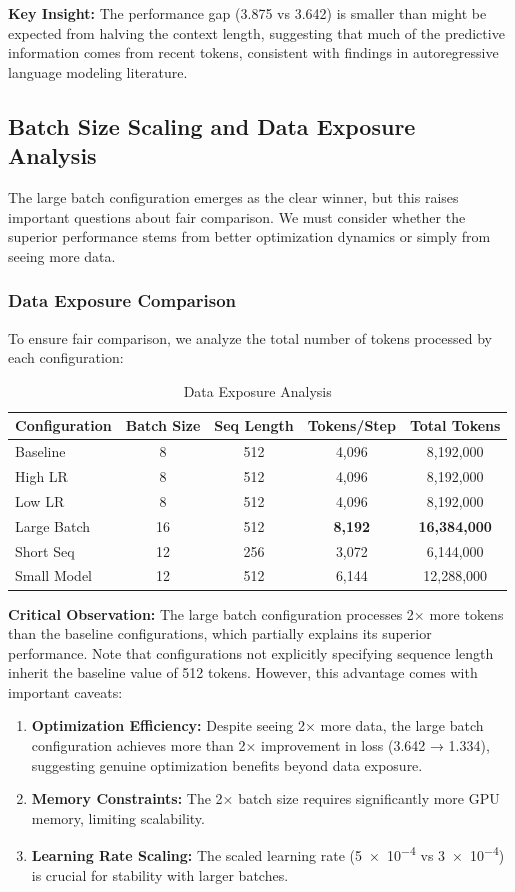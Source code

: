 \documentclass[11pt,a4paper]{article}
\begin{document}
\textbf{Key Insight:} The performance gap (3.875 vs 3.642) is smaller than might be expected from halving the context length, suggesting that much of the predictive information comes from recent tokens, consistent with findings in autoregressive language modeling literature.

\subsection{Batch Size Scaling and Data Exposure Analysis}
The large batch configuration emerges as the clear winner, but this raises important questions about fair comparison. We must consider whether the superior performance stems from better optimization dynamics or simply from seeing more data.

\subsubsection{Data Exposure Comparison}
To ensure fair comparison, we analyze the total number of tokens processed by each configuration:

\begin{table}[H]
\centering
\caption{Data Exposure Analysis}
\label{tab:data_exposure}
\begin{tabular}{@{}lcccc@{}}
\toprule
Configuration & Batch Size & Seq Length & Tokens/Step & Total Tokens \\
\midrule
Baseline & 8 & 512 & 4,096 & 8,192,000 \\
High LR & 8 & 512 & 4,096 & 8,192,000 \\
Low LR & 8 & 512 & 4,096 & 8,192,000 \\
Large Batch & 16 & 512 & \textbf{8,192} & \textbf{16,384,000} \\
Short Seq & 12 & 256 & 3,072 & 6,144,000 \\
Small Model & 12 & 512 & 6,144 & 12,288,000 \\
\bottomrule
\end{tabular}
\end{table}

\textbf{Critical Observation:} The large batch configuration processes 2× more tokens than the baseline configurations, which partially explains its superior performance. Note that configurations not explicitly specifying sequence length inherit the baseline value of 512 tokens. However, this advantage comes with important caveats:

\begin{enumerate}
    \item \textbf{Optimization Efficiency:} Despite seeing 2× more data, the large batch configuration achieves more than 2× improvement in loss (3.642 → 1.334), suggesting genuine optimization benefits beyond data exposure.
    
    \item \textbf{Memory Constraints:} The 2× batch size requires significantly more GPU memory, limiting scalability.
    
    \item \textbf{Learning Rate Scaling:} The scaled learning rate (\num{5e-4} vs \num{3e-4}) is crucial for stability with larger batches.
\end{enumerate}
\end{document}
